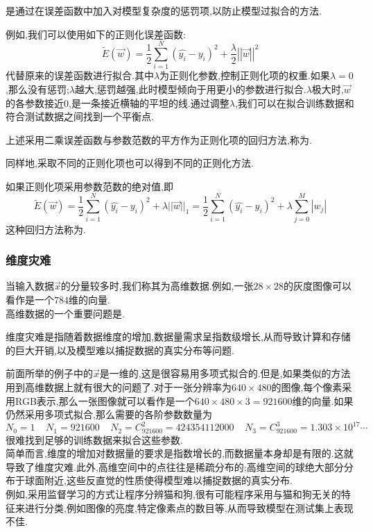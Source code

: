 \documentclass{ctexart}
\begin{document}
\begin{definition}[正则化]
    是通过在误差函数中加入对模型复杂度的惩罚项,以防止模型过拟合的方法.
\end{definition}
例如,我们可以使用如下的正则化误差函数:
\[\tilde{E}(\vec{w})=\dfrac12\sum_{i=1}^{N}\left(\hat{y_i}-y_i\right)^2+\dfrac{\lambda}{2}\left|\left|\vec{w}\right|\right|^2\]
代替原来的误差函数进行拟合.其中$\lambda$为正则化参数,控制正则化项的权重.如果$\lambda=0$,那么没有惩罚;$\lambda$越大,惩罚越强,此时模型倾向于用更小的参数进行拟合.$\lambda$极大时,$\vec{w}$的各参数接近$0$,是一条接近横轴的平坦的线.通过调整$\lambda$,我们可以在拟合训练数据和符合测试数据之间找到一个平衡点.
\begin{definition}[岭回归]
    上述采用二乘误差函数与参数范数的平方作为正则化项的回归方法,称为.
\end{definition}
同样地,采取不同的正则化项也可以得到不同的正则化方法.
\begin{definition}[Lasso回归]
    如果正则化项采用参数范数的绝对值,即
    \[\tilde{E}(\vec{w})=\dfrac12\sum_{i=1}^{N}\left(\hat{y_i}-y_i\right)^2+\lambda||\vec{w}||_1=\dfrac12\sum_{i=1}^{N}\left(\hat{y_i}-y_i\right)^2+\lambda\sum_{j=0}^{M}|w_j|\]
    这种回归方法称为.
\end{definition}
\subsubsection{维度灾难}
当输入数据$\vec{x}$的分量较多时,我们称其为高维数据.例如,一张$28\times 28$的灰度图像可以看作是一个$784$维的向量.\\
\indent 高维数据的一个重要问题是.
\begin{definition}[维度灾难]
    维度灾难是指随着数据维度的增加,数据量需求呈指数级增长,从而导致计算和存储的巨大开销,以及模型难以捕捉数据的真实分布等问题.
\end{definition}
前面所举的例子中的$\vec{x}$是一维的,这是很容易用多项式拟合的.但是,如果类似的方法用到高维数据上就有很大的问题了.对于一张分辨率为$640\times480$的图像,每个像素采用RGB表示,那么一张图像就可以看作是一个$640\times480\times3=921600$维的向量.如果仍然采用多项式拟合,那么需要的各阶参数数量为
\[N_0=1\ \ \ \ \ N_1=921600\ \ \ \ \ N_2=C_{921600}^2=424354112000\ \ \ \ \ N_3=C_{921600}^3=1.303\times10^{17}\cdots\]
很难找到足够的训练数据来拟合这些参数.\\
\indent 简单而言,维度的增加对数据量的要求是指数增长的,而数据量本身却是有限的.这就导致了维度灾难.此外,高维空间中的点往往是稀疏分布的;高维空间的球绝大部分分布于球面附近,这些反直觉的性质使得模型难以捕捉数据的真实分布.\\
\indent 例如,采用监督学习的方式让程序分辨猫和狗,很有可能程序采用与猫和狗无关的特征来进行分类,例如图像的亮度,特定像素点的数目等,从而导致模型在测试集上表现不佳.
\end{document}
